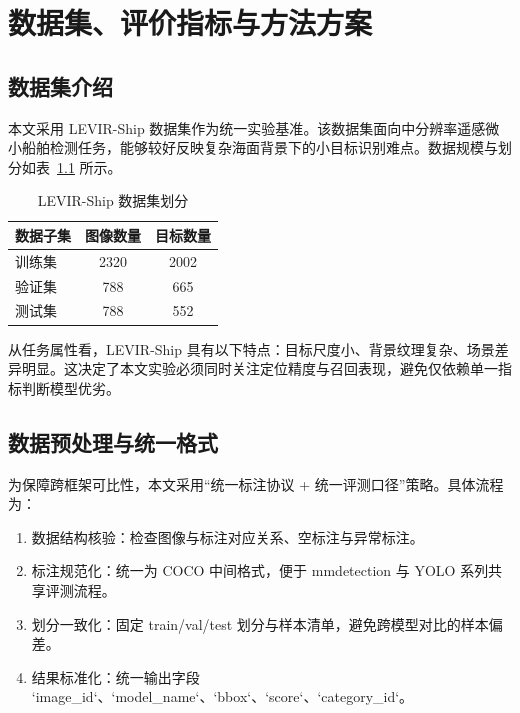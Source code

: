 \chapter{数据集、评价指标与方法方案}
\label{ch:method}

\section{数据集介绍}

本文采用 LEVIR-Ship 数据集作为统一实验基准\cite{levirship2021_dataset,chen2022_tinyship_drenet}。该数据集面向中分辨率遥感微小船舶检测任务，能够较好反映复杂海面背景下的小目标识别难点。数据规模与划分如表~\ref{tab:ch3_dataset_split} 所示。

\begin{table}[htbp]
  \centering
  \caption{LEVIR-Ship 数据集划分}
  \label{tab:ch3_dataset_split}
  \begin{tabular}{lcc}
    \hline
    数据子集 & 图像数量 & 目标数量 \\
    \hline
    训练集 & 2320 & 2002 \\
    验证集 & 788 & 665 \\
    测试集 & 788 & 552 \\
    \hline
  \end{tabular}
\end{table}

从任务属性看，LEVIR-Ship 具有以下特点：目标尺度小、背景纹理复杂、场景差异明显。这决定了本文实验必须同时关注定位精度与召回表现，避免仅依赖单一指标判断模型优劣。

\section{数据预处理与统一格式}

为保障跨框架可比性，本文采用“统一标注协议 + 统一评测口径”策略。具体流程为：

\begin{enumerate}
  \item 数据结构核验：检查图像与标注对应关系、空标注与异常标注。
  \item 标注规范化：统一为 COCO 中间格式，便于 mmdetection 与 YOLO 系列共享评测流程。
  \item 划分一致化：固定 train/val/test 划分与样本清单，避免跨模型对比的样本偏差。
  \item 结果标准化：统一输出字段 `image_id`、`model_name`、`bbox`、`score`、`category_id`。
\end{enumerate}

